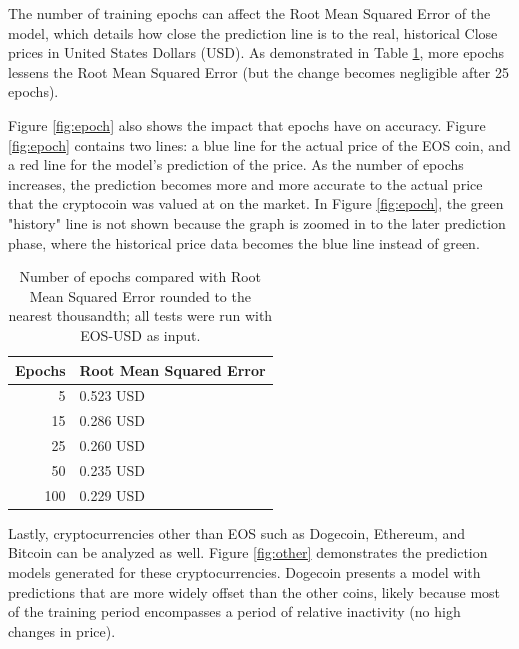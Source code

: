 The number of training epochs can affect the Root Mean Squared Error of the model, which details how close the prediction line is to the real, historical Close prices in United States Dollars (USD). As demonstrated in Table \ref{tab:epochvsrmse}, more epochs lessens the Root Mean Squared Error (but the change becomes negligible after 25 epochs).

Figure \ref{fig:epoch} also shows the impact that epochs have on accuracy. Figure \ref{fig:epoch} contains two lines: a blue line for the actual price of the EOS coin, and a red line for the model's prediction of the price. As the number of epochs increases, the prediction becomes more and more accurate to the actual price that the cryptocoin was valued at on the market. In Figure \ref{fig:epoch}, the green "history" line is not shown because the graph is zoomed in to the later prediction phase, where the historical price data becomes the blue line instead of green.

\begin{table}[htb]
\caption{Number of epochs compared with Root Mean Squared Error rounded to the nearest thousandth; all tests were run with EOS-USD as input.}
\label{tab:epochvsrmse}
\begin{tabular}{rl}
Epochs &   Root Mean Squared Error   \\
\hline
 5      & 0.523 USD              \\
 15     & 0.286 USD              \\
 25     & 0.260 USD              \\
 50     & 0.235 USD              \\
 100    & 0.229 USD              \\
\hline
\end{tabular}
\end{table}

Lastly, cryptocurrencies other than EOS such as Dogecoin, Ethereum, and Bitcoin can be analyzed as well. Figure \ref{fig:other} demonstrates the prediction models generated for these cryptocurrencies. Dogecoin presents a model with predictions that are more widely offset than the other coins, likely because most of the training period encompasses a period of relative inactivity (no high changes in price). 



